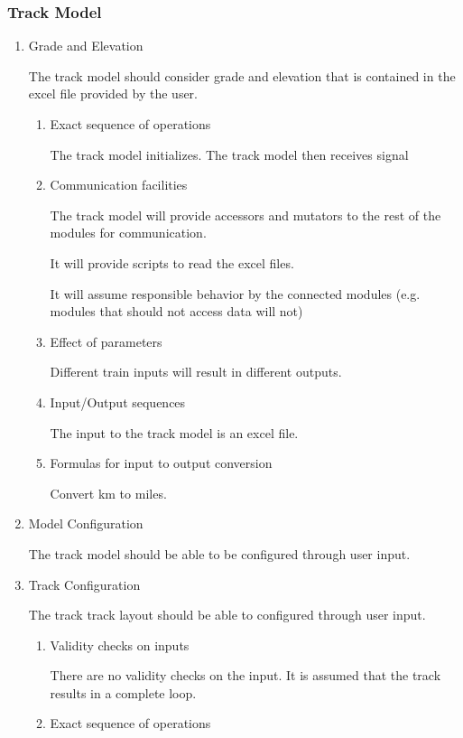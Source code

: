 \documentclass[11pt]{article}
\begin{document}
\subsubsection{Track Model}
\label{sec-3-1-3}
\begin{enumerate}
\item Grade and Elevation
\label{sec-3-1-3-1}

The track model should consider grade and elevation that is contained in the excel file provided by the user.
\begin{enumerate}
\item Exact sequence of operations
\label{sec-3-1-3-1-1}

The track model initializes. The track model then receives signal
\item Communication facilities
\label{sec-3-1-3-1-2}

The track model will provide accessors and mutators to the rest of the modules for communication. 

It will provide scripts to read the excel files. 

It will assume responsible behavior by the connected modules (e.g. modules that should not access data will not)
\item Effect of parameters
\label{sec-3-1-3-1-3}

Different train inputs will result in different outputs.
\item Input/Output sequences
\label{sec-3-1-3-1-4}

The input to the track model is an excel file.
\item Formulas for input to output conversion
\label{sec-3-1-3-1-5}

Convert km to miles.
\end{enumerate}
\item Model Configuration
\label{sec-3-1-3-2}

The track model should be able to be configured through user input.
\item Track Configuration
\label{sec-3-1-3-3}

The track track layout should be able to configured through user input.
\begin{enumerate}
\item Validity checks on inputs
\label{sec-3-1-3-3-1}

There are no validity checks on the input. It is assumed that the track results in a complete loop.
\item Exact sequence of operations
\label{sec-3-1-3-3-2}


\end{enumerate}
\end{enumerate}
\end{document}
